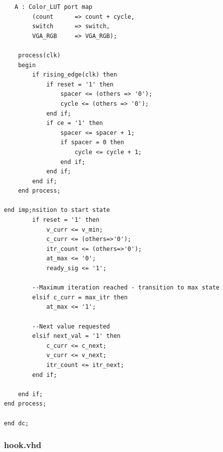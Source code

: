 \documentclass{article}
\begin{document}
\begin{lstlisting}
   A : Color_LUT port map 
		(count		=> count + cycle,
		switch		=> switch,
		VGA_RGB		=> VGA_RGB);

	process(clk)
	begin
		if rising_edge(clk) then
			if reset = '1' then
				spacer <= (others => '0');
				cycle <= (others => '0');
			end if;
			if ce = '1' then
				spacer <= spacer + 1;
				if spacer = 0 then
					cycle <= cycle + 1;
				end if;
			end if;
		end if;
	end process;

end imp;nsition to start state
		if reset = '1' then
			v_curr <= v_min;
			c_curr <= (others=>'0');
			itr_count <= (others=>'0');
			at_max <= '0';
			ready_sig <= '1';
			
		--Maximum iteration reached - transition to max state
		elsif c_curr = max_itr then
			at_max <= '1';
			
		--Next value requested
		elsif next_val = '1' then			
			c_curr <= c_next;
			v_curr <= v_next;			
			itr_count <= itr_next;					
		end if;
		
	end if;
end process;

end dc;
\end{lstlisting}

\subsubsection{hook.vhd}							%
\end{document}
